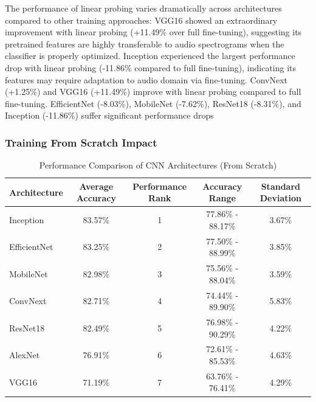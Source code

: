 \documentclass[11pt]{article}
\begin{document}
The performance of linear probing varies dramatically across architectures compared to other training approaches: VGG16 showed an extraordinary improvement with linear probing (+11.49\% over full fine-tuning), suggesting its pretrained features are highly transferable to audio spectrograms when the classifier is properly optimized. 
Inception experienced the largest performance drop with linear probing (-11.86\% compared to full fine-tuning), indicating its features may require adaptation to audio domain via fine-tuning. ConvNext (+1.25\%) and VGG16 (+11.49\%) improve with linear probing compared to full fine-tuning. EfficientNet (-8.03\%), MobileNet (-7.62\%), ResNet18 (-8.31\%), and Inception (-11.86\%) suffer significant performance drops
\subsubsection{Training From Scratch Impact}
\begin{table}[ht]
    \centering
    \begin{tabular}{lcccc}
    \toprule
    \textbf{Architecture} & \textbf{Average Accuracy} & \textbf{Performance Rank} & \textbf{Accuracy Range} & \textbf{Standard Deviation} \\
    \midrule
    Inception & 83.57\% & 1 & 77.86\% - 88.17\% & 3.67\% \\
    EfficientNet & 83.25\% & 2 & 77.50\% - 88.99\% & 3.85\% \\
    MobileNet & 82.98\% & 3 & 75.56\% - 88.04\% & 3.59\% \\
    ConvNext & 82.71\% & 4 & 74.44\% - 89.90\% & 5.83\% \\
    ResNet18 & 82.49\% & 5 & 76.98\% - 90.29\% & 4.22\% \\
    AlexNet & 76.91\% & 6 & 72.61\% - 85.53\% & 4.63\% \\
    VGG16 & 71.19\% & 7 & 63.76\% - 76.41\% & 4.29\% \\
    \bottomrule
    \end{tabular}
    \caption{Performance Comparison of CNN Architectures (From Scratch)}
    \label{tab:cnn_scratch}
\end{table}
\end{document}

